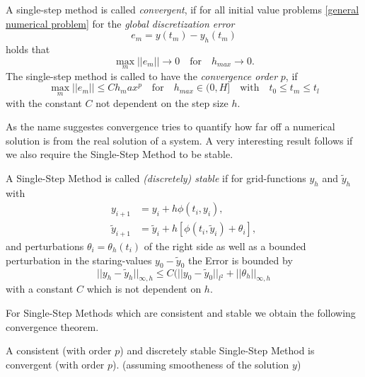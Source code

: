 	\begin{definition}\label{Convergence_SingleStep}
		A single-step method is called \emph{convergent}, if for all initial value problems \ref{general numerical problem} for the \emph{global discretization error}
		\begin{displaymath}
			e_m = y(t_m)-y_h(t_m)
		\end{displaymath}
		holds that
		\begin{displaymath}
			\max\limits_{m}||e_m|| \to 0 \quad \text{for} \quad h_{max} \to 0.
		\end{displaymath}
		The single-step method is called to have the \emph{convergence order} $p$, if
		\begin{displaymath}
			\max\limits_{m} ||e_m|| \leq C h_max^p \quad \text{for} \quad h_{max} \in \mathopen{(} 0,H \mathclose{]} \quad \text{with} \quad t_0 \leq t_m \leq t_l
		\end{displaymath}
		with the constant $C$ not dependent on the step size $h$.
	\end{definition}

	As the name suggestes convergence tries to quantify how far off a numerical solution is from the real solution of a system. A very interesting result follows if we also require the Single-Step Method to be stable.
	
	\begin{definition}\label{Discrete_Stability_SingleStep - lecture notes for numpdgl}
		A Single-Step Method is called \emph{(discretely) stable} if for grid-functions $y_h$ and $\tilde{y}_h$ with
		\begin{align}
			y_{i+1} &= y_i + h \phi(t_i, y_i), \\
			\tilde{y}_{i+1} &=  \tilde{y}_i + h [\phi(t_i, \tilde{y}_i) + \theta_i],
		\end{align}
		and perturbations $\theta_i = \theta_h(t_i)$ of the right side as well as a bounded perturbation in the staring-values $y_0 - \tilde{y}_0$ the Error is bounded by
		\begin{displaymath}
			||y_h - \tilde{y}_h||_{\infty,h} \leq C (||y_0 - \tilde{y}_0||_{l^2} + ||\theta_h||_{\infty,h}
		\end{displaymath}
		with a constant $C$ which is not dependent on $h$.
	\end{definition}
	
	For Single-Step Methods which are consistent and stable we obtain the following convergence theorem.
	
	\begin{theorem}\label{Lax-Richtmyer}
		A consistent (with order $p$) and discretely stable Single-Step Method is convergent (with order $p$). (assuming smootheness of the solution $y$)
	\end{theorem}
	
